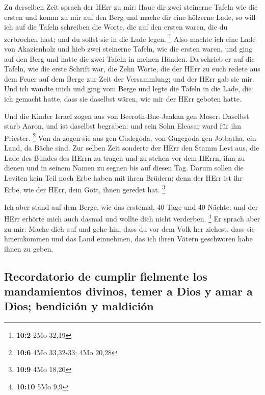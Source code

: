  Zu derselben Zeit sprach der HErr zu mir: Haue dir zwei
steinerne Tafeln wie die ersten und komm zu mir auf den Berg und mache
dir eine hölzerne Lade,  so will ich auf die Tafeln
schreiben die Worte, die auf den ersten waren, die du zerbrochen hast;
und du sollst sie in die Lade legen. \footnote{\textbf{10:2} 2Mo 32,19}
 Also machte ich eine Lade von Akazienholz und hieb zwei
steinerne Tafeln, wie die ersten waren, und ging auf den Berg und hatte
die zwei Tafeln in meinen Händen.  Da schrieb er auf die
Tafeln, wie die erste Schrift war, die Zehn Worte, die der HErr zu euch
redete aus dem Feuer auf dem Berge zur Zeit der Versammlung; und der
HErr gab sie mir.  Und ich wandte mich und ging vom Berge
und legte die Tafeln in die Lade, die ich gemacht hatte, dass sie
daselbst wären, wie mir der HErr geboten hatte.

 Und die Kinder Israel zogen aus von Beeroth-Bne-Jaakan
gen Moser. Daselbst starb Aaron, und ist daselbst begraben; und sein
Sohn Eleasar ward für ihn Priester. \footnote{\textbf{10:6} 4Mo
  33,32-33; 4Mo 20,28}  Von da zogen sie aus gen Gudegoda,
von Gugegoda gen Jotbatha, ein Land, da Bäche sind.  Zur
selben Zeit sonderte der HErr den Stamm Levi aus, die Lade des Bundes
des HErrn zu tragen und zu stehen vor dem HErrn, ihm zu dienen und in
seinem Namen zu segnen bis auf diesen Tag.  Darum sollen
die Leviten kein Teil noch Erbe haben mit ihren Brüdern; denn der HErr
ist ihr Erbe, wie der HErr, dein Gott, ihnen geredet hat. \footnote{\textbf{10:9}
  4Mo 18,20}

 Ich aber stand auf dem Berge, wie das erstemal, 40 Tage
und 40 Nächte; und der HErr erhörte mich auch dasmal und wollte dich
nicht verderben. \footnote{\textbf{10:10} 5Mo 9,9}  Er
sprach aber zu mir: Mache dich auf und gehe hin, dass du vor dem Volk
her ziehest, dass sie hineinkommen und das Land einnehmen, das ich ihren
Vätern geschworen habe ihnen zu geben.

\hypertarget{recordatorio-de-cumplir-fielmente-los-mandamientos-divinos-temer-a-dios-y-amar-a-dios-bendiciuxf3n-y-maldiciuxf3n}{%
\subsection{Recordatorio de cumplir fielmente los mandamientos divinos,
temer a Dios y amar a Dios; bendición y
maldición}\label{recordatorio-de-cumplir-fielmente-los-mandamientos-divinos-temer-a-dios-y-amar-a-dios-bendiciuxf3n-y-maldiciuxf3n}}


